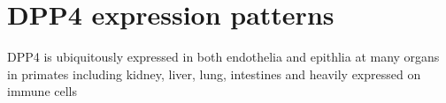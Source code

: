 \section{DPP4 expression patterns}
DPP4 is ubiquitously expressed in both endothelia and epithlia at many organs in primates including kidney, liver, lung, intestines and heavily expressed on immune cells